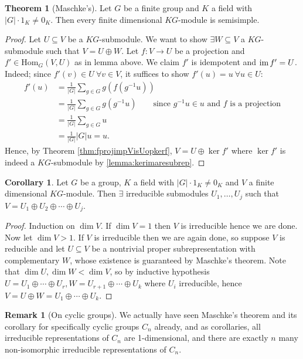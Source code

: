 \documentclass[a4paper]{article}
\newcommand{\Hom}{\text{Hom}}
\newcommand{\im}{\text{im\,}}
\theoremstyle{definition}
\newtheorem{thm}[defn]{Theorem}
\newtheorem{coro}[defn]{Corollary}
\newtheorem*{remark}{Remark}
\begin{document}
\begin{thm}[Maschke's]
\label{thm:Maschkes}
Let $G$ be a finite group and $K$ a field with $|G|\cdot 1_K\neq 0_K$. Then every finite dimensional $KG$-module is semisimple.
\end{thm}
\begin{proof}
Let $U\subseteq V$ be a $KG$-submodule. We want to show $\exists W\subseteq V$ a $KG$-submodule such that $V=U\oplus W$. Let $f:V\rightarrow U$ be a projection and $f'\in\Hom_G(V,U)$ as in lemma above. We claim $f'$ is idempotent and $\im f'=U$. Indeed; since $f'(v)\in U \ \forall v\in V$, it suffices to show $f'(u)=u \ \forall u\in U$:
\[
\begin{aligned}
f'(u)&=\frac{1}{|G|}\sum_{g\in G}g\left(f\left(g^{-1}u\right)\right) \\
&=\frac{1}{|G|}\sum_{g\in G}g\left(g^{-1}u\right) \qquad \text{since }g^{-1}u\in u\text{ and }f\text{ is a projection}\\
&=\frac{1}{|G|}\sum_{g\in G}u\\
&=\frac{1}{|G|}|G|u=u.
\end{aligned}
\]
Hence, by Theorem \ref{thm:fprojimpVisUopkerf}, $V=U\oplus\ker f'$ where $\ker f'$ is indeed a $KG$-submodule by \ref{lemma:kerimaresubrep}.
\end{proof}

\begin{coro}
Let $G$ be a group, $K$ a field with $|G|\cdot 1_K\neq 0_K$ and $V$ a finite dimensional $KG$-module. Then $\exists$ irreducible submodules $U_1,\ldots,U_j$ such that $V=U_1\oplus U_2\oplus\cdots\oplus U_j$.
\end{coro}
\begin{proof}
Induction on $\dim V$. If $\dim V=1$ then $V$ is irreducible hence we are done. Now let $\dim V>1$. If $V$ is irreducible then we are again done, so suppose $V$ is reducible and let $U\subseteq V$ be a nontrivial proper subrepresentation with complementary $W$, whose existence is guaranteed by Maschke's theorem. Note that $\dim U,\dim W<\dim V$, so by inductive hypothesis $U=U_1\oplus\cdots\oplus U_r,W=U_{r+1}\oplus\cdots\oplus U_k$ where $U_i$ irreducible, hence $V=U\oplus W=U_1\oplus\cdots\oplus U_k$.
\end{proof}

\begin{remark}[On cyclic groups]
We actually have seen Maschke's theorem and its corollary for specifically cyclic groups $C_n$ already, and as corollaries, all irreducible representations of $C_n$ are 1-dimensional, and there are exactly $n$ many non-isomorphic irreducible representations of $C_n$.
\end{remark}
\end{document}
